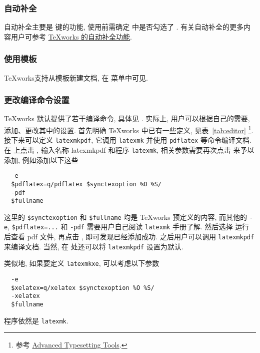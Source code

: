 \subsubsection{自动补全}

自动补全主要是  键的功能,
使用前需确定  中是否勾选了 . 
有关自动补全的更多内容用户可参考
\href{https://github.com/EthanDeng/texworks-autocomplete}{\TeX works 的自动补全功能}. 

\subsubsection{使用模板}

\TeX works支持从模板新建文档, 在  菜单中可见. 

\subsubsection{更改编译命令设置}

\TeX works 默认提供了若干编译命令,
具体见 .
实际上,
用户可以根据自己的需要,
添加、更改其中的设置.
首先明确 \TeX works 中已有一些定义,
见表~\ref{tab:editor} \footnote{参考 \href{https://github.com/TeXworks/texworks/wiki/AdvancedTypesettingTools}{Advanced Typesetting Tools}.}.
接下来可以定义 \texttt{latexmkpdf},
它调用 \texttt{latexmk} 并使用 \texttt{pdflatex} 等命令编译文档.
在  上点击 \menu{+},
输入名称 \textsf{latexmkpdf} 和程序 \texttt{latexmk},
相关参数需要再次点击 \menu{+} 来予以添加,
例如添加以下这些
\begin{lstlisting}
  -e
  $pdflatex=q/pdflatex $synctexoption %O %S/
  -pdf
  $fullname
\end{lstlisting}
这里的 \texttt{\$synctexoption} 和 \texttt{\$fullname} 均是 \TeX works 预定义的内容,
而其他的 \texttt{-e}, \texttt{\$pdflatex=...} 和 \texttt{-pdf} 需要用户自己阅读 \texttt{latexmk} 手册了解.
然后选择 \textsf{运行后查看 pdf 文件},
再点击 ,
即可发现已经添加成功.
之后用户可以调用 \texttt{latexmkpdf} 来编译文档.
当然,
在  处还可以将 \texttt{latexmkpdf} 设置为默认.

类似地,
如果要定义 \texttt{latexmkxe},
可以考虑以下参数
\begin{lstlisting}
  -e
  $xelatex=q/xelatex $synctexoption %O %S/
  -xelatex
  $fullname
\end{lstlisting}
程序依然是 \texttt{latexmk}.

